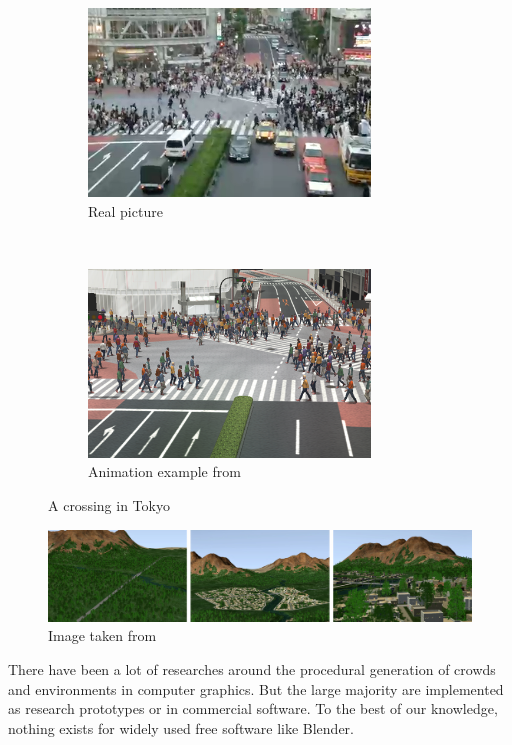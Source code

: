 \documentclass[a4paper,11pt]{article}
\begin{document}
\begin{figure}[h]
  \centering

  \begin{subfigure}[t]{0.5\textwidth} 
    \includegraphics[width=7.5cm]{PLE_real.png}
    \caption{Real picture}
  \end{subfigure}%
  ~
  \begin{subfigure}[t]{0.5\textwidth}
    \includegraphics[width=7.5cm]{PLE_simu.png}
    \caption{Animation example from \cite{PLE}} 
  \end{subfigure}
  \caption{A crossing in Tokyo}
  \label{fig:crowd}
\end{figure}

\begin{figure}[h]
  \includegraphics[width=15cm]{env1.jpg}
  \caption{Image taken from \cite{DeclarativeArchitecture}}
  \label{fig:env}
\end{figure}


There have been a lot of researches around the procedural generation of crowds and environments in computer graphics. But the large majority are implemented as research prototypes or in commercial software. To the best of our knowledge, nothing exists for widely used free software like Blender.
\end{document}
